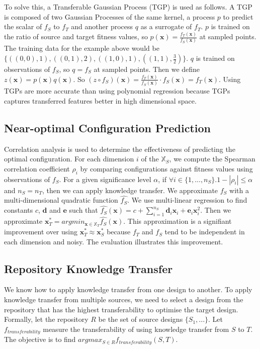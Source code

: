 \documentclass[10pt,a4paper]{article}
\begin{document}
To solve this, a Transferable Gaussian Process (TGP) is used as follows. A TGP is composed of two Gaussian Processes of the same kernel, a process $p$ to predict the scalar of $f_S$ to $f_T$ and another process $q$ as a surrogate of $f_T$. $p$ is trained on the ratio of source and target fitness values, so $p(\mathbf{x})=\frac{f_T(\mathbf{x})}{f_S(\mathbf{x})}$ at sampled points. The training data for the example above would be $\{((0,0),1),((0,1),2),((1,0),1),((1,1),\frac{3}{2})\}$. $q$ is trained on observations of $f_S$, so $q=f_S$ at sampled points. Then we define $z(\mathbf{x})=p(\mathbf{x})q(\mathbf{x})$. So $(z\circ f_S)(\mathbf{x})=\frac{f_T(\mathbf{x})}{f_S(\mathbf{x})}\cdot f_S(\mathbf{x})=f_T(\mathbf{x})$. Using TGPs are more accurate than using polynomial regression because TGPs captures transferred features better in high dimensional space.

\subsection{Near-optimal Configuration Prediction}
Correlation analysis is used to determine the effectiveness of predicting the optimal configuration. For each dimension $i$ of the $\mathbb{X}_S$, we compute the Spearman correlation coefficient $\rho_i$ by comparing configurations against fitness values using observations of $f_S$. For a given significance level $\alpha$, if $\forall i\in\{1,...,n_S\}.1-|\rho_i|\le\alpha$ and $n_S=n_T$, then we can apply knowledge transfer. We approximate $f_S$ with a multi-dimensional quadratic function $\hat{f_S}$. We use multi-linear regression to find constants $c$, $\mathbf{d}$ and $\mathbf{e}$ such that $\hat{f_S}(\mathbf{x})=c+\sum_{i=1}^{n_S}\mathbf{d}_i \mathbf{x}_i+\mathbf{e}_i \mathbf{x}_i^2$. Then we approximate $\mathbf{x}_T^*=argmin_{\mathbf{x}\in\mathbb{X}_T}\hat{f_S}(\mathbf{x})$. This approximation is a signifiant improvement over using $\mathbf{x}_T^*\approx\mathbf{x}_S^*$ because $f_T$ and $f_S$ tend to be independent in each dimension and noisy\cite{Xi2004}. The evaluation illustrates this improvement.

\subsection{Repository Knowledge Transfer}

We know how to apply knowledge transfer from one design to another. To apply knowledge transfer from multiple sources, we need to select a design from the repository that has the highest transferability to optimise the target design. Formally, let the repository $R$ be the set of source designs $\{S_1,...\}$. Let $f_{transferability}$ measure the transferability of using knowledge transfer from $S$ to $T$. The objective is to find $argmax_{S\in R}f_{transferability}(S,T)$.
\end{document}
